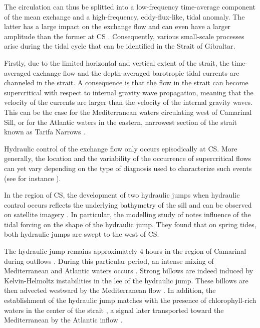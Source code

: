 The circulation can thus be splitted into a low-frequency time-average component of the mean exchange and a high-frequency, eddy-flux-like, tidal anomaly. The latter has a large impact on the exchange flow \citep{Naranjo2014} and can even have a larger amplitude than the former at CS \citep{vargas_2006}. Consequently, various small-scale processes arise during the tidal cycle that can be identified in the Strait of Gibraltar.

Firstly, due to the limited horizontal and vertical extent of the strait, the time-averaged exchange flow and the depth-averaged barotropic tidal currents are channeled in the strait. A consequence is that the flow in the strait can become supercritical with respect to internal gravity wave propagation, meaning that the velocity of the currents are larger than the velocity of the internal gravity waves. This can be the case for the Mediterranean waters circulating west of Camarinal Sill, or for the Atlantic waters in the eastern, narrowest section of the strait known as Tarifa Narrows \citep{FA1988}. %

Hydraulic control of the exchange flow only occurs episodically at CS. More generally, the location and the variability of the occurrence of supercritical flows can yet vary depending on the type of diagnosis used to characterize such events (see for instance \citet{FA1988,vargas_2006,sannino_2007,sanchez-roman_2012}). 

In the region of CS, the development of two hydraulic jumps when hydraulic control occurs reflects the underlying bathymetry of the sill and can be observed on satellite imagery \citep{brandt_1996,sanchez-garrido_2011}. In particular, the modelling study of \citet{sanchez-garrido_2011} notes influence of the tidal forcing on the shape of the hydraulic jump. They found that on spring tides, both hydraulic jumps are swept to the west of CS.

The hydraulic jump remains approximately 4 hours in the region of Camarinal during outflows \citep{FA1988,vlasenko_2009}. During this particular period, an intense mixing of Mediterranean and Atlantic waters occurs \citep{wesson_1994,macias_2006,GarciaLafuente2011}. Strong billows are indeed induced by Kelvin-Helmoltz instabilities in the lee of the hydraulic jump. These billows are then advected westward by the Mediterranean flow \citep{wesson_1994}. In addition, the establishment of the hydraulic jump matches with the presence of chlorophyll-rich waters in the center of the strait , a signal later transported toward the Mediterranean by the Atlantic inflow \citep{bruno_2013}.

